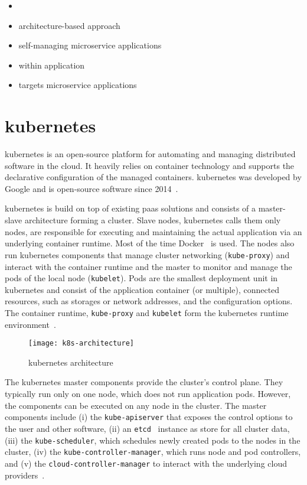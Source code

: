   \begin{itemize}
    \item \cite{ToffettiMicroservices}
    \item architecture-based approach
    \item self-managing microservice applications
    \item within application
    \item targets microservice applications
  \end{itemize}

\section[Kubernetes]{\gls{kubernetes}}\label{sec:kubernetes}
  \Gls{kubernetes} is an open-source platform for automating and managing distributed software in the cloud.
  It heavily relies on container technology and supports the declarative configuration of the managed containers.
  \Gls{kubernetes} was developed by Google and is open-source software since 2014~\cite{kubernetes}.

  \Gls{kubernetes} is build on top of existing \gls{paas} solutions and consists of a master-slave architecture forming a cluster.
  Slave nodes, \gls{kubernetes} calls them only nodes, are responsible for executing and maintaining the actual application via an underlying container runtime.
  Most of the time Docker~\cite{docker} is used.
  The nodes also run \gls{kubernetes} components that manage cluster networking (\texttt{kube-proxy}) and interact with the container runtime and the master to monitor and manage the pods of the local node (\texttt{kubelet}).
  Pods are the smallest deployment unit in \gls{kubernetes} and consist of the application container (or multiple), connected resources, such as storages or network addresses, and the configuration options.
  The container runtime, \texttt{kube-proxy} and \texttt{kubelet} form the \gls{kubernetes} runtime environment~\cite{kubernetes}.

  \begin{figure}
    \centering
    \texttt{[image: k8s-architecture]}
    \caption{\Gls{kubernetes} architecture}
    \label{fig:kubernetes-architecture}
  \end{figure}

  The \gls{kubernetes} master components provide the cluster's control plane.
  They typically run only on one node, which does not run application pods.
  However, the components can be executed on any node in the cluster.
  The master components include
  (i) the \texttt{kube-apiserver} that exposes the control options to the user and other software,
  (ii) an \texttt{etcd}~\cite{etcd} instance as store for all cluster data,
  (iii) the \texttt{kube-scheduler}, which schedules newly created pods to the nodes in the cluster,
  (iv) the \texttt{kube-controller-manager}, which runs node and pod controllers, and
  (v) the \texttt{cloud-controller-manager} to interact with the underlying cloud providers~\cite{kubernetes}.

